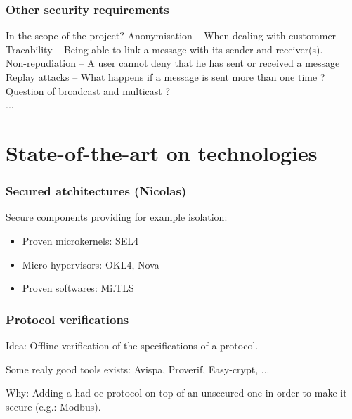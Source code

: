\documentclass{beamer}
\begin{document}
\begin{frame}
    \frametitle{Other security requirements}

    \begin{block}{In the scope of the project?}
        Anonymisation -- When dealing with custommer\\
        \medskip
        Tracability -- Being able to link a message with its sender and receiver(s).\\
        \medskip
        Non-repudiation -- A user cannot deny that he has sent or received a message\\
        \medskip
        Replay attacks -- What happens if a message is sent more than one time ?\\
        \medskip
        Question of broadcast and multicast ?\\
        \medskip
        ...
    \end{block}
\end{frame}

\section{State-of-the-art on technologies}

\begin{frame}
    \tableofcontents[currentsection]
\end{frame}

\begin{frame}
    \frametitle{Secured atchitectures (Nicolas)}

    Secure components providing for example isolation:
    \vfill
    \begin{itemize}
        \item Proven microkernels: SEL4
            \vfill
        \item Micro-hypervisors: OKL4, Nova
            \vfill
        \item Proven softwares: Mi.TLS
    \end{itemize}
\end{frame}

\begin{frame}
    \frametitle{Protocol verifications}

    \begin{block}{Idea:}
        Offline verification of the specifications of a protocol.
    \end{block}
    \vfill
    Some realy good tools exists: Avispa, Proverif, Easy-crypt, ...
    \vfill
    \begin{block}{Why:}
        Adding a had-oc protocol on top of an unsecured one in order to make it secure (e.g.: Modbus).
    \end{block}
\end{frame}
\end{document}
